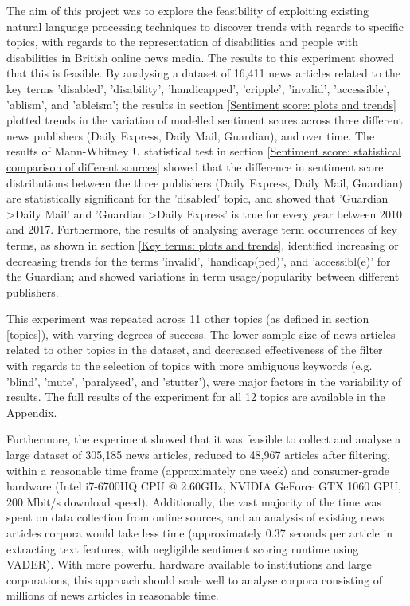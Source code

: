 \documentclass{report}
\begin{document}
The aim of this project was to explore the feasibility of exploiting existing natural language processing techniques to discover trends with regards to specific topics, with regards to the representation of disabilities and people with disabilities in British online news media.
The results to this experiment showed that this is feasible.
By analysing a dataset of 16,411 news articles related to the key terms 'disabled', 'disability', 'handicapped', 'cripple', 'invalid', 'accessible', 'ablism', and 'ableism'; the results in section \ref{Sentiment score: plots and trends} plotted trends in the variation of modelled sentiment scores across three different news publishers (Daily Express, Daily Mail, Guardian), and over time.
The results of Mann-Whitney U statistical test in section \ref{Sentiment score: statistical comparison of different sources} showed that the difference in sentiment score distributions between the three publishers (Daily Express, Daily Mail, Guardian) are statistically significant for the 'disabled' topic, and showed that 'Guardian \textgreater\space Daily Mail' and 'Guardian \textgreater\space Daily Express' is true for every year between 2010 and 2017.
Furthermore, the results of analysing average term occurrences of key terms, as shown in section \ref{Key terms: plots and trends}, identified increasing or decreasing trends for the terms 'invalid', 'handicap(ped)', and 'accessibl(e)' for the Guardian; and showed variations in term usage/popularity between different publishers.

This experiment was repeated across 11 other topics (as defined in section \ref{topics}), with varying degrees of success. 
The lower sample size of news articles related to other topics in the dataset, and decreased effectiveness of the filter with regards to the selection of topics with more ambiguous keywords (e.g. 'blind', 'mute', 'paralysed', and 'stutter'), were major factors in the variability of results.
The full results of the experiment for all 12 topics are available in the Appendix.
 
Furthermore, the experiment showed that it was feasible to collect and analyse a large dataset of 305,185 news articles, reduced to 48,967 articles after filtering, within a reasonable time frame (approximately one week) and consumer-grade hardware (Intel i7-6700HQ CPU @ 2.60GHz, NVIDIA GeForce GTX 1060 GPU, 200 Mbit/s download speed).
Additionally, the vast majority of the time was spent on data collection from online sources, and an analysis of existing news articles corpora would take less time (approximately 0.37 seconds per article in extracting text features, with negligible sentiment scoring runtime using VADER).
With more powerful hardware available to institutions and large corporations, this approach should scale well to analyse corpora consisting of millions of news articles in reasonable time.
\end{document}
